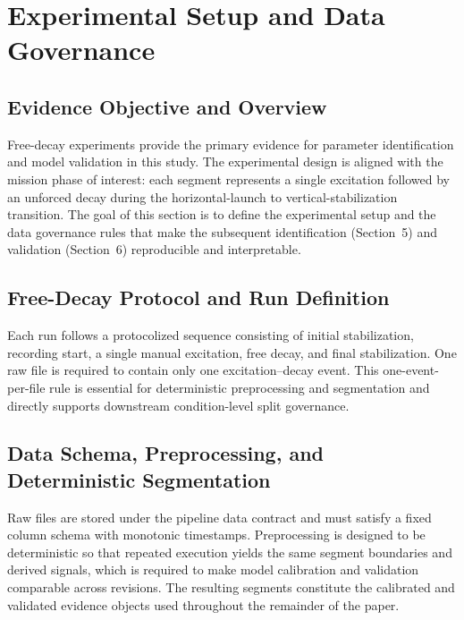\section{Experimental Setup and Data Governance}

\subsection{Evidence Objective and Overview}

Free-decay experiments provide the primary evidence for parameter identification and model validation in this study. The experimental design is aligned with the mission phase of interest: each segment represents a single excitation followed by an unforced decay during the horizontal-launch to vertical-stabilization transition. The goal of this section is to define the experimental setup and the data governance rules that make the subsequent identification (Section~5) and validation (Section~6) reproducible and interpretable.

\subsection{Free-Decay Protocol and Run Definition}

Each run follows a protocolized sequence consisting of initial stabilization, recording start, a single manual excitation, free decay, and final stabilization. One raw file is required to contain only one excitation--decay event. This one-event-per-file rule is essential for deterministic preprocessing and segmentation and directly supports downstream condition-level split governance.

\subsection{Data Schema, Preprocessing, and Deterministic Segmentation}

Raw files are stored under the pipeline data contract and must satisfy a fixed column schema with monotonic timestamps. Preprocessing is designed to be deterministic so that repeated execution yields the same segment boundaries and derived signals, which is required to make model calibration and validation comparable across revisions. The resulting segments constitute the calibrated and validated evidence objects used throughout the remainder of the paper.

